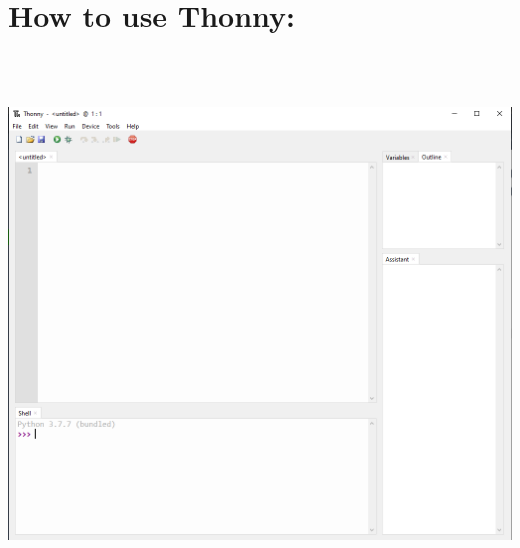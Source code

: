 \documentclass[11pt, letterpaper, onecolumn, oneside, final]{article}
\begin{document}
\section{How to use Thonny:}\\
\\
\begin{center}
\includegraphics[scale=.3]{thonny}
\end{center}
\end{document}

